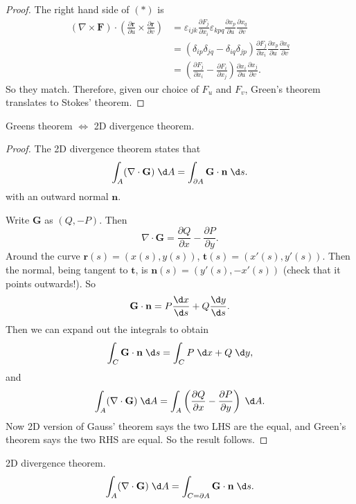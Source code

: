\documentclass[a4paper]{article}
\begin{document}
\begin{proof}
  The right hand side of $(*)$ is
  \begin{align*}
    (\nabla \times \mathbf{F})\cdot \left(\frac{\partial \mathbf{r}}{\partial u}\times \frac{\partial \mathbf{r}}{\partial v}\right) &= \varepsilon_{ijk}\frac{\partial F_j}{\partial x_i}\varepsilon_{kpq}\frac{\partial x_p}{\partial u}\frac{\partial x_q}{\partial v}\\
    &= (\delta_{ip}\delta_{jq} - \delta_{iq}\delta_{jp}) \frac{\partial F_j}{\partial x_i}\frac{\partial x_p}{\partial u}\frac{\partial x_q}{\partial v}\\
    &= \left(\frac{\partial F_j}{\partial x_i} - \frac{\partial F_i}{\partial x_j}\right)\frac{\partial x_i}{\partial u}\frac{\partial x_j}{\partial v}.
  \end{align*}
  So they match. Therefore, given our choice of $F_u$ and $F_v$, Green's theorem translates to Stokes' theorem.
\end{proof}


\begin{prop}
  Greens theorem $\Leftrightarrow$ 2D divergence theorem.
\end{prop}

\begin{proof}
  The 2D divergence theorem states that
  \[
    \int_A (\nabla\cdot \mathbf{G})\;\d A = \int_{\partial A} \mathbf{G}\cdot \mathbf{n}\;\d s.
  \]
  with an outward normal $\mathbf{n}$.

  Write $\mathbf{G}$ as $(Q, -P)$. Then
  \[
    \nabla\cdot \mathbf{G} = \frac{\partial Q}{\partial x} - \frac{\partial P}{\partial y}.
  \]
  Around the curve $\mathbf{r}(s) = (x(s), y(s))$, $\mathbf{t}(s) = (x'(s), y'(s))$. Then the normal, being tangent to $\mathbf{t}$, is $\mathbf{n}(s) = (y'(s), -x'(s))$ (check that it points outwards!). So
  \[
    \mathbf{G}\cdot \mathbf{n} = P\frac{\d x}{\d s} + Q\frac{\d y}{\d s}.
  \]
  Then we can expand out the integrals to obtain
  \[
    \int_C \mathbf{G}\cdot \mathbf{n}\;\d s = \int_C P\;\d x + Q\;\d y,
  \]
  and
  \[
    \int_A(\nabla\cdot \mathbf{G})\;\d A = \int_A\left(\frac{\partial Q}{\partial x} - \frac{\partial P}{\partial y}\right)\;\d A.
  \]
  Now 2D version of Gauss' theorem says the two LHS are the equal, and Green's theorem says the two RHS are equal. So the result follows.
\end{proof}

\begin{prop}
  2D divergence theorem.
  \[
    \int_A (\nabla\cdot \mathbf{G})\;\d A = \int_{C = \partial A} \mathbf{G}\cdot \mathbf{n}\;\d s.
  \]
\end{prop}
\end{document}
